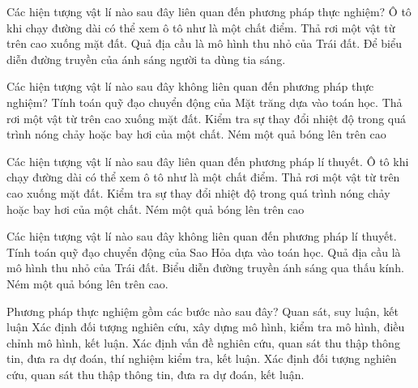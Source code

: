 \begin{ex}
Các hiện tượng vật lí nào sau đây liên quan đến phương pháp thực nghiệm?
\choice
{Ô tô khi chạy đường dài có thể xem ô tô như là một chất điểm.}
{\True Thả rơi một vật từ trên cao xuống mặt đất.}
{Quả địa cầu là mô hình thu nhỏ của Trái đất.}
{Để biểu diễn đường truyền của ánh sáng người ta dùng tia sáng.}
\end{ex}

\begin{ex}
Các hiện tượng vật lí nào sau đây không liên quan đến phương pháp thực nghiệm?
\choice
{\True Tính toán quỹ đạo chuyển động của Mặt trăng dựa vào toán học.}
{Thả rơi một vật từ trên cao xuống mặt đất.}
{Kiểm tra sự thay đổi nhiệt độ trong quá trình nóng chảy hoặc bay hơi của một chất.}
{Ném một quả bóng lên trên cao}
\end{ex}

\begin{ex}
Các hiện tượng vật lí nào sau đây liên quan đến phương pháp lí thuyết.
\choice
{\True Ô tô khi chạy đường dài có thể xem ô tô như là một chất điểm.}
{Thả rơi một vật từ trên cao xuống mặt đất.}
{Kiểm tra sự thay đổi nhiệt độ trong quá trình nóng chảy hoặc bay hơi của một chất.}
{Ném một quả bóng lên trên cao}
\end{ex}

\begin{ex}
Các hiện tượng vật lí nào sau đây không liên quan đến phương pháp lí thuyết.
\choice
{Tính toán quỹ đạo chuyển động của Sao Hỏa dựa vào toán học.}
{Quả địa cầu là mô hình thu nhỏ của Trái đất.}
{Biểu diễn đường truyền ánh sáng qua thấu kính.}
{\True Ném một quả bóng lên trên cao.}
\end{ex}

\begin{ex}
Phương pháp thực nghiệm gồm các bước nào sau đây? 
\choice
{Quan sát, suy luận, kết luận}
{Xác định đối tượng nghiên cứu, xây dựng mô hình, kiểm tra mô hình, điều chỉnh mô hình, kết luận.}
{\True Xác định vấn đề nghiên cứu, quan sát thu thập thông tin, đưa ra dự đoán, thí nghiệm kiểm tra, kết luận.}
{Xác định đối tượng nghiên cứu, quan sát thu thập thông tin, đưa ra dự đoán, kết luận.}
\end{ex}
